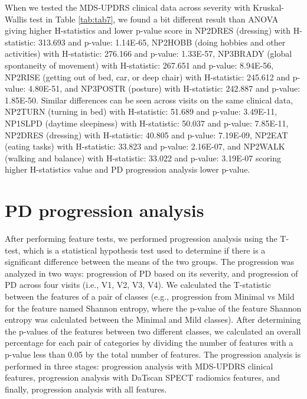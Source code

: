 \documentclass[twocolumn]{article}
\begin{document}
When we tested the MDS-UPDRS clinical data across severity with Kruskal-Wallis test in Table \ref{tab:tab7}, we found a bit different result than ANOVA giving higher H-statistics and lower p-value score in NP2DRES (dressing) with H-statistic: 313.693 and p-value: 1.14E-65, NP2HOBB (doing hobbies and other activities) with H-statistic: 276.166 and p-value: 1.33E-57, NP3BRADY (global spontaneity of movement) with H-statistic: 267.651 and p-value: 8.94E-56, NP2RISE (getting out of bed, car, or deep chair) with H-statistic: 245.612 and p-value: 4.80E-51, and NP3POSTR (posture) with H-statistic: 242.887 and p-value: 1.85E-50. Similar differences can be seen across visits on the same clinical data, NP2TURN (turning in bed) with H-statistic: 51.689 and p-value: 3.49E-11, NP1SLPD (daytime sleepiness) with H-statistic: 50.037 and p-value: 7.85E-11, NP2DRES (dressing) with H-statistic: 40.805 and p-value: 7.19E-09, NP2EAT (eating tasks) with H-statistic: 33.823 and p-value: 2.16E-07, and NP2WALK (walking and balance) with H-statistic: 33.022 and p-value: 3.19E-07 scoring higher H-statistics value and PD progression analysis lower p-value.

\section{PD progression analysis}
\label{PD Progression}

After performing feature tests, we performed progression analysis using the T-test, which is a statistical hypothesis test used to determine if there is a significant difference between the means of the two groups. The progression was analyzed in two ways: progression of PD based on its severity, and progression of PD across four visits (i.e., V1, V2, V3, V4). We calculated the T-statistic between the features of a pair of classes (e.g., progression from Minimal vs Mild for the feature named Shannon entropy, where the p-value of the feature Shannon entropy was calculated between the Minimal and Mild classes). After determining the p-values of the features between two different classes, we calculated an overall percentage for each pair of categories by dividing the number of features with a p-value less than 0.05 by the total number of features. The progression analysis is performed in three stages: progression analysis with MDS-UPDRS clinical features, progression analysis with DaTscan SPECT radiomics features, and finally, progression analysis with all features.
\end{document}
